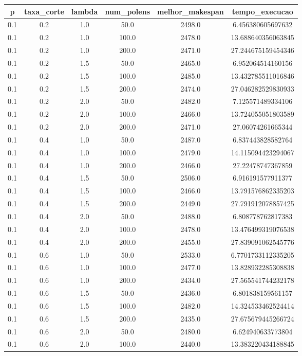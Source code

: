 \begin{tabular}{cccccc}
p & taxa_corte & lambda & num_polens & melhor_makespan & tempo_execucao \\ \hline
0.1 & 0.2 & 1.0 & 50.0 & 2498.0 & 6.456380605697632 \\
0.1 & 0.2 & 1.0 & 100.0 & 2478.0 & 13.688640356063845 \\
0.1 & 0.2 & 1.0 & 200.0 & 2471.0 & 27.244675159454346 \\
0.1 & 0.2 & 1.5 & 50.0 & 2465.0 & 6.952064514160156 \\
0.1 & 0.2 & 1.5 & 100.0 & 2485.0 & 13.432785511016846 \\
0.1 & 0.2 & 1.5 & 200.0 & 2474.0 & 27.046282529830933 \\
0.1 & 0.2 & 2.0 & 50.0 & 2482.0 & 7.125571489334106 \\
0.1 & 0.2 & 2.0 & 100.0 & 2466.0 & 13.724055051803589 \\
0.1 & 0.2 & 2.0 & 200.0 & 2471.0 & 27.06074261665344 \\
0.1 & 0.4 & 1.0 & 50.0 & 2487.0 & 6.837443828582764 \\
0.1 & 0.4 & 1.0 & 100.0 & 2479.0 & 14.115094423294067 \\
0.1 & 0.4 & 1.0 & 200.0 & 2466.0 & 27.22478747367859 \\
0.1 & 0.4 & 1.5 & 50.0 & 2506.0 & 6.916191577911377 \\
0.1 & 0.4 & 1.5 & 100.0 & 2466.0 & 13.791576862335203 \\
0.1 & 0.4 & 1.5 & 200.0 & 2449.0 & 27.791912078857425 \\
0.1 & 0.4 & 2.0 & 50.0 & 2488.0 & 6.808778762817383 \\
0.1 & 0.4 & 2.0 & 100.0 & 2478.0 & 13.476499319076538 \\
0.1 & 0.4 & 2.0 & 200.0 & 2455.0 & 27.839091062545776 \\
0.1 & 0.6 & 1.0 & 50.0 & 2533.0 & 6.7701733112335205 \\
0.1 & 0.6 & 1.0 & 100.0 & 2477.0 & 13.828932285308838 \\
0.1 & 0.6 & 1.0 & 200.0 & 2434.0 & 27.565541744232178 \\
0.1 & 0.6 & 1.5 & 50.0 & 2436.0 & 6.801838159561157 \\
0.1 & 0.6 & 1.5 & 100.0 & 2482.0 & 14.324533462524414 \\
0.1 & 0.6 & 1.5 & 200.0 & 2435.0 & 27.675679445266724 \\
0.1 & 0.6 & 2.0 & 50.0 & 2480.0 & 6.624940633773804 \\
0.1 & 0.6 & 2.0 & 100.0 & 2440.0 & 13.383220434188845 \\

\end{tabular}
